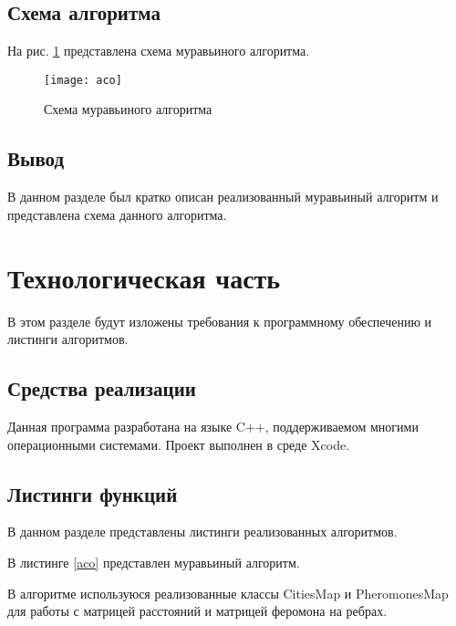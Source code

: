 \documentclass[a4paper, 14pt]{article}
\begin{document}
    \subsection{Схема алгоритма}
    
    На рис. \ref{fig:aco} представлена схема муравьиного алгоритма.
    
    \begin{figure}[H]
        	\begin{center}
        		\texttt{[image: aco]}
        		\caption{Схема муравьиного алгоритма}
        		\label{fig:aco}
        	\end{center}
        \end{figure}
	\subsection{Вывод}
	
	В данном разделе был кратко описан реализованный муравьиный алгоритм и представлена схема данного алгоритма.

	\newpage
	\section{Технологическая часть}
	
	В этом разделе будут изложены требования к программному обеспечению и листинги алгоритмов.
	
	\subsection{Средства реализации}
	
		Данная программа разработана на языке C++, поддерживаемом многими операционными системами. Проект выполнен в среде Xcode. 
	
\subsection{Листинги функций}

В данном разделе представлены листинги реализованных алгоритмов.

	В листинге \ref{aco} представлен муравьиный алгоритм.
	
	В алгоритме используюся реализованные классы CitiesMap и PheromonesMap для работы с матрицей расстояний и матрицей феромона на ребрах.
\end{document}
